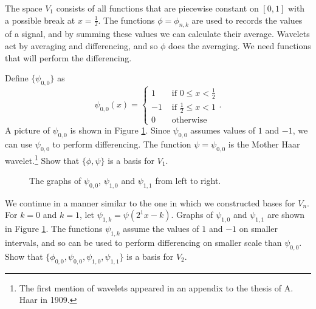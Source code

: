 \begin{pactivity} \label{act:psi} The space $V_1$ consists of all functions that are piecewise constant on $[0,1]$ with a possible break at $x=\frac{1}{2}$. The functions $\phi = \phi_{n,k}$ are used to records the values of a signal, and by summing these values we can calculate their average. Wavelets act by averaging and differencing, and so $\phi$ does the averaging. We need functions that will perform the differencing.  
\ba
\item Define $\{\psi_{0,0}\}$ as 
	\[\psi_{0,0}(x) = \begin{cases}
	1 &\text{ if } 0 \leq x < \frac{1}{2} \\
	-1 &\text{ if } \frac{1}{2} \leq x < 1 \\
	0 &\text{ otherwise}
	\end{cases}.\]
	A picture of $\psi_{0,0}$ is shown in Figure \ref{F:psi_graphs}. Since $\psi_{0,0}$ assumes values of $1$ and $-1$, we can use $\psi_{0,0}$ to perform differencing. The function $\psi = \psi_{0,0}$ is the Mother Haar wavelet.\footnote{The first mention of wavelets appeared in an appendix to the thesis of A. Haar in 1909.} Show that $\{\phi, \psi\}$ is a basis for $V_1$. 
\begin{figure}[h]
\begin{center}
\caption{The graphs of $\psi_{0,0}$, $\psi_{1,0}$ and $\psi_{1,1}$ from left to right.}
\label{F:psi_graphs}
\end{center}

\end{figure}
    

	\item We continue in a manner similar to the one in which we constructed bases for $V_n$. For $k=0$ and $k=1$, let $\psi_{1,k} = \psi\left(2^1x-k\right)$. Graphs of $\psi_{1,0}$ and $\psi_{1,1}$ are shown in Figure \ref{F:psi_graphs}. The functions $\psi_{1,k}$ assume the values of $1$ and $-1$ on smaller intervals, and so can be used to perform differencing on smaller scale than $\psi_{0,0}$. Show that $\{\phi_{0,0}, \psi_{0,0}, \psi_{1,0}, \psi_{1,1}\}$ is a basis for $V_2$. 


	\ea
\end{pactivity}

